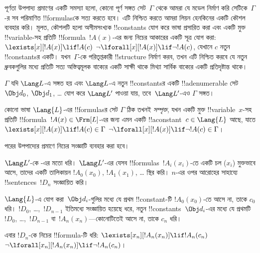 \documentclass[../../../include/open-logic-section]{subfiles}
\begin{document}


\begin{explain}
পূর্ণতা উপপাদ্য প্রমাণের একটি সমস্যা হলো, কোনো পূর্ণ সঙ্গত
সেট~$\Gamma$ থেকে আমরা যে মডেল নির্মাণ করি সেটিকে~$\Gamma$-র সব পরিমাণিত
!!{formula}sকে সত্য করতে হবে। এটি নিশ্চিত করতে আমরা লিয়ন হেনকিনের একটি
কৌশল ব্যবহার করি। মূলত, কৌশলটি হলো অসীমসংখ্যক !!{constant}s যোগ করে ভাষা
প্রসারিত করা এবং একটি মুক্ত !!{variable}-সহ প্রতিটি
!!{formula}~$!A(x)$-এর জন্য নিচের আকারের একটি সূত্র যোগ করা:
      {$\lexists[x][!A(x)] \lif !A(c)$}
      {$\lnot\lforall[x][!A(x)] \lif \lnot !A(c)$},
যেখানে $c$ নতুন !!{constant}sর একটি। যখন~$\Gamma$-কে পরিতৃপ্তকারী
!!{structure} নির্মাণ করব, তখন এটি নিশ্চিত করবে যে নতুন ধ্রুবকগুলির মধ্যে
প্রতিটি
{সত্য অস্তিত্বমূলক বাক্যের একটি সাক্ষী থাকে}
{মিথ্যা সার্বিক বাক্যের একটি প্রতিদৃষ্টান্ত থাকে}।
\end{explain}

\begin{prop}
$\Gamma$ যদি $\Lang L$-এ সঙ্গত হয় এবং $\Lang L$-এ নতুন
!!{constant}sর একটি !!a{denumerable} সেট $\Obj d_0$, $\Obj d_1$,
\dots{} যোগ করে $\Lang L'$ পাওয়া যায়, তবে~$\Lang L'$-এও $\Gamma$
সঙ্গত।
\end{prop}

\begin{defn}[সম্পৃক্ত সেট]
কোনো ভাষা $\Lang {L}$-এর !!{formula}sর সেট $\Gamma$ ঠিক তখনই
\emph{সম্পৃক্ত}, যখন একটি মুক্ত !!{variable}~$x$-সহ প্রতিটি
!!{formula}~$!A(x) \in \Frm[L]$-এর জন্য এমন একটি !!a{constant}~$c \in
\Lang{L}$ আছে, যাতে
      {$\lexists[x][!A(x)] \lif !A(c) \in \Gamma$}
      {$\lnot\lforall[x][!A(x)] \lif \lnot !A(c) \in \Gamma$}।
\end{defn}

পরের উপপাদ্যের প্রমাণে নিচের সংজ্ঞাটি ব্যবহার করা হবে।

\begin{defn}
$\Lang L'$-কে -এর মতো ধরি। $\Lang L'$-এর যেসব
!!{formula}s~$!A_i(x_i)$-তে একটি চল ($x_i$) মুক্তভাবে আসে, তাদের একটি
তালিকায়ন $!A_0(x_0)$, $!A_1(x_1)$, \dots{} স্থির করি। $n$-এর ওপর
আরোহের সাহায্যে !!{sentence}s~$!D_n$ সংজ্ঞায়িত করি।

$\Lang{L}$-এ যোগ করা~$\Obj d_i$-গুলির মধ্যে যে প্রথম !!{constant}-টি
$!A_0(x_0)$-তে আসে না, তাকে $c_0$ ধরি। $!D_0$, \dots,~$!D_{n-1}$
ইতিমধ্যে সংজ্ঞায়িত হয়েছে ধরে, নতুন !!{constant}s~$\Obj d_i$-এর মধ্যে
যে প্রথমটি $!D_0$, \dots,~$!D_{n-1}$ বা~$!A_n(x_n)$—কোনোটিতেই আসে না,
তাকে $c_n$ ধরি।

এবার $!D_{n}$-কে নিচের !!{formula}-টি ধরি: 
{$\lexists[x_{n}][!A_{n}(x_{n})] \lif
  !A_{n}(c_{n})$}{$\lnot\lforall[x_{n}][!A_{n}(x_{n})] \lif \lnot
  !A_{n}(c_{n})$}।
\end{defn}
\end{document}
